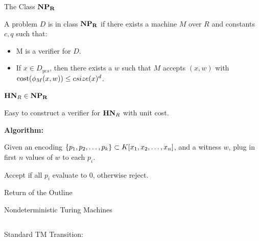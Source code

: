\documentclass[c]{beamer}
\begin{document}
\begin{frame}{The Class $\mathbf{NP_R}$}

  A problem $D$ is in class $\mathbf{NP_R}$ if there exists a machine $M$ over
  $R$ and constants $c, q$ such that:

  \begin{itemize}
    \item M is a verifier for $D$.
    \item If $x \in D_{yes}$, then there exists a $w$ such that $M$
      accepts $(x, w)$ with $\text{cost}(\phi_M(x, w)) \leq c
      size(x)^d$.
    \end{itemize}
  
\end{frame}

\begin{frame}{$\mathbf{HN}_R \in \mathbf{NP_R}$}

  Easy to construct a verifier for $\mathbf{HN}_R$ with unit cost.

  \vspace{\baselineskip}

  \textbf{Algorithm:}

  Given an encoding $\{p_1, p_2, \ldots, p_k\} \subset K[x_1, x_2,\ldots,x_n]$,
  and a witness $w$, plug in first $n$ values of $w$ to each $p_i$.

  \vspace{\baselineskip}

  Accept if all $p_i$ evaluate to $0$, otherwise reject.

\end{frame}

\begin{frame}{Return of the Outline}
  \begin{center}
    \scaletopagewidth{\outlinefinal}
  \end{center}
\end{frame}

\begin{frame}{Nondeterministic Turing Machines}

  \begin{columns}

    Standard TM Transition:
       

    \begin{center}
      \detercomptm{}
    \end{center}
  \end{columns}
\end{frame}
\end{document}
